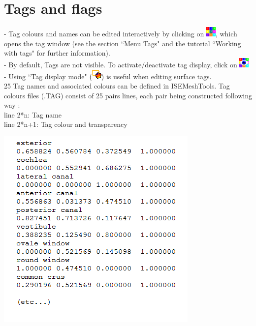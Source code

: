 \section{Tags and flags}

\begin{minipage}{0.55\textwidth}
- Tag colours and names can be edited interactively by
clicking on \includegraphics[scale=0.7]{images/pixmap/Show_Tag_Window2.png}, which opens the tag window (see the section
``Menu Tags" and the tutorial ``Working with tags" for
further information).\\
- By default, Tags are not visible. To activate/deactivate tag
display, click on \includegraphics[scale=0.7]{images/pixmap/Show_Tag_Window.png}\\
- Using ``Tag display mode" (\includegraphics[scale=0.7]{images/pixmap/Tag_select_mode.png}) is useful when editing
surface tags.\\
25 Tag names and associated colours can be defined in ISEMeshTools.
Tag colours files (.TAG) consist of 25 pairs lines,
each pair being constructed following way :\\
line 2*n: Tag name\\
line 2*n+1: Tag colour and transparency
\end{minipage}  
 \begin{minipage}{0.45\textwidth}\centering
  \includegraphics[scale=0.5]{images/Icons/Tags.png}
 \end{minipage} 

